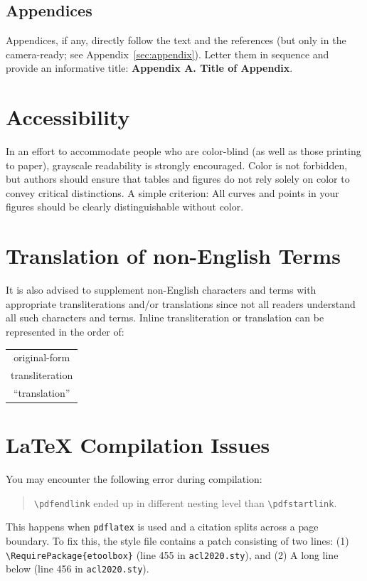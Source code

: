 \documentclass[11pt,a4paper]{article}
\begin{document}
\subsection{Appendices}
Appendices, if any, directly follow the text and the
references (but only in the camera-ready; see Appendix~\ref{sec:appendix}).
Letter them in sequence and provide an informative title:
\textbf{Appendix A. Title of Appendix}.

\section{Accessibility}
\label{ssec:accessibility}

In an effort to accommodate people who are color-blind (as well as those printing to paper), grayscale readability is strongly encouraged.
Color is not forbidden, but authors should ensure that tables and figures do not rely solely on color to convey critical distinctions.
A simple criterion:
All curves and points in your figures should be clearly distinguishable without color.

\section{Translation of non-English Terms}

It is also advised to supplement non-English characters and terms with appropriate transliterations and/or translations since not all readers understand all such characters and terms.
Inline transliteration or translation can be represented in the order of:
\begin{center}
\begin{tabular}{c}
original-form \\
transliteration \\
``translation''
\end{tabular}
\end{center}

\section{\LaTeX{} Compilation Issues}
You may encounter the following error during compilation: 
\begin{quote}
{\small\verb|\pdfendlink|} ended up in different nesting level than {\small\verb|\pdfstartlink|}.
\end{quote}
This happens when \texttt{\small pdflatex} is used and a citation splits across a page boundary.
To fix this, the style file contains a patch consisting of two lines:
(1) {\small\verb|\RequirePackage{etoolbox}|} (line 455 in \texttt{\small acl2020.sty}), and
(2) A long line below (line 456 in \texttt{\small acl2020.sty}).
\end{document}

